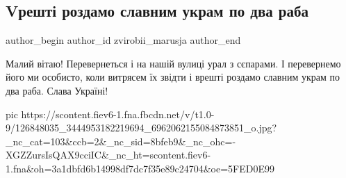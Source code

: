  
 
 
 
 
 
\subsection{Vрешті роздамо славним украм по два раба}
\label{sec:21_11_2020.fb.zvirobii_marusja.2.dva_raba}
\ifcmt
	author_begin
   author_id zvirobii_marusja
	author_end
\fi

Малий вітаю! Перевернеться і на нашій вулиці урал з сєпарами. І перевернемо
його ми особисто, коли витрясем їх звідти і врешті роздамо славним украм по два
раба. Слава Україні!

\ifcmt
pic https://scontent.fiev6-1.fna.fbcdn.net/v/t1.0-9/126848035_3444953182219694_6962062155084873851_o.jpg?_nc_cat=103&ccb=2&_nc_sid=8bfeb9&_nc_ohc=-XGZZursIsQAX9cciIC&_nc_ht=scontent.fiev6-1.fna&oh=3a1dbfd6b14998df7dc7f35e89c24704&oe=5FED0E99
\fi
